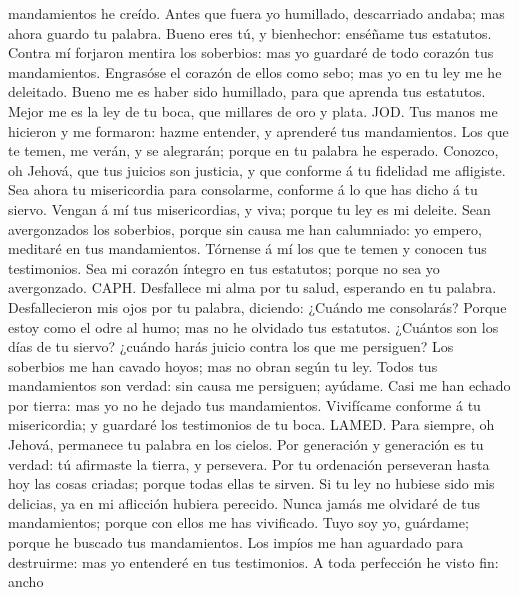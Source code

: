 mandamientos he creído.  Antes que fuera yo humillado,
descarriado andaba; mas ahora guardo tu palabra.  Bueno
eres tú, y bienhechor: enséñame tus estatutos.  Contra mí
forjaron mentira los soberbios: mas yo guardaré de todo corazón tus
mandamientos.  Engrasóse el corazón de ellos como sebo; mas
yo en tu ley me he deleitado.  Bueno me es haber sido
humillado, para que aprenda tus estatutos.  Mejor me es la
ley de tu boca, que millares de oro y plata.  JOD. Tus
manos me hicieron y me formaron: hazme entender, y aprenderé tus
mandamientos.  Los que te temen, me verán, y se alegrarán;
porque en tu palabra he esperado.  Conozco, oh Jehová, que
tus juicios son justicia, y que conforme á tu fidelidad me afligiste.
 Sea ahora tu misericordia para consolarme, conforme á lo
que has dicho á tu siervo.  Vengan á mí tus misericordias,
y viva; porque tu ley es mi deleite.  Sean avergonzados los
soberbios, porque sin causa me han calumniado: yo empero, meditaré en
tus mandamientos.  Tórnense á mí los que te temen y conocen
tus testimonios.  Sea mi corazón íntegro en tus estatutos;
porque no sea yo avergonzado.  CAPH. Desfallece mi alma por
tu salud, esperando en tu palabra.  Desfallecieron mis ojos
por tu palabra, diciendo: ¿Cuándo me consolarás?  Porque
estoy como el odre al humo; mas no he olvidado tus estatutos.
 ¿Cuántos son los días de tu siervo? ¿cuándo harás juicio
contra los que me persiguen?  Los soberbios me han cavado
hoyos; mas no obran según tu ley.  Todos tus mandamientos
son verdad: sin causa me persiguen; ayúdame.  Casi me han
echado por tierra: mas yo no he dejado tus mandamientos. 
Vivifícame conforme á tu misericordia; y guardaré los testimonios de tu
boca.  LAMED. Para siempre, oh Jehová, permanece tu palabra
en los cielos.  Por generación y generación es tu verdad:
tú afirmaste la tierra, y persevera.  Por tu ordenación
perseveran hasta hoy las cosas criadas; porque todas ellas te sirven.
 Si tu ley no hubiese sido mis delicias, ya en mi aflicción
hubiera perecido.  Nunca jamás me olvidaré de tus
mandamientos; porque con ellos me has vivificado.  Tuyo soy
yo, guárdame; porque he buscado tus mandamientos.  Los
impíos me han aguardado para destruirme: mas yo entenderé en tus
testimonios.  A toda perfección he visto fin: ancho
